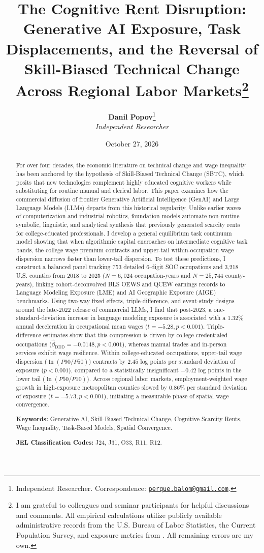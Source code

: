 \documentclass[12pt]{article}
\title{\textbf{The Cognitive Rent Disruption: Generative AI Exposure, Task Displacements, and the Reversal of Skill-Biased Technical Change Across Regional Labor Markets}\thanks{I am grateful to colleagues and seminar participants for helpful discussions and comments. All empirical calculations utilize publicly available administrative records from the U.S. Bureau of Labor Statistics, the Current Population Survey, and exposure metrics from \citet{felten2021, felten2023}. All remaining errors are my own.}}
\author{
    \textbf{Danil Popov}\thanks{Independent Researcher. Correspondence: \href{mailto:perque.balom@gmail.com}{\texttt{perque.balom@gmail.com}}.} \\
    \textit{Independent Researcher}
}
\date{October 27, 2026}
\begin{document}
\maketitle

\begin{abstract}
\noindent For over four decades, the economic literature on technical change and wage inequality has been anchored by the hypothesis of Skill-Biased Technical Change (SBTC), which posits that new technologies complement highly educated cognitive workers while substituting for routine manual and clerical labor. This paper examines how the commercial diffusion of frontier Generative Artificial Intelligence (GenAI) and Large Language Models (LLMs) departs from this historical regularity. Unlike earlier waves of computerization and industrial robotics, foundation models automate non-routine symbolic, linguistic, and analytical synthesis that previously generated scarcity rents for college-educated professionals. I develop a general equilibrium task continuum model showing that when algorithmic capital encroaches on intermediate cognitive task bands, the college wage premium contracts and upper-tail within-occupation wage dispersion narrows faster than lower-tail dispersion. To test these predictions, I construct a balanced panel tracking 753 detailed 6-digit SOC occupations and 3,218 U.S. counties from 2018 to 2025 ($N = 6,024$ occupation-years and $N = 25,744$ county-years), linking cohort-deconvolved BLS OEWS and QCEW earnings records to Language Modeling Exposure (LME) and AI Geographic Exposure (AIGE) benchmarks. Using two-way fixed effects, triple-difference, and event-study designs around the late-2022 release of commercial LLMs, I find that post-2023, a one-standard-deviation increase in language modeling exposure is associated with a $1.32\%$ annual deceleration in occupational mean wages ($t = -5.28, p < 0.001$). Triple-difference estimates show that this compression is driven by college-credentialed occupations ($\hat{\beta}_{\text{DDD}} = -0.0148, p < 0.001$), whereas manual trades and in-person services exhibit wage resilience. Within college-educated occupations, upper-tail wage dispersion ($\ln(P90/P50)$) contracts by $2.45$ log points per standard deviation of exposure ($p < 0.001$), compared to a statistically insignificant $-0.42$ log points in the lower tail ($\ln(P50/P10)$). Across regional labor markets, employment-weighted wage growth in high-exposure metropolitan counties slowed by $0.86\%$ per standard deviation of exposure ($t = -5.73, p < 0.001$), initiating a measurable phase of spatial wage convergence.

\vspace{1em}
\noindent \textbf{Keywords:} Generative AI, Skill-Biased Technical Change, Cognitive Scarcity Rents, Wage Inequality, Task-Based Models, Spatial Convergence.

\vspace{0.5em}
\noindent \textbf{JEL Classification Codes:} J24, J31, O33, R11, R12.
\end{abstract}
\end{document}

